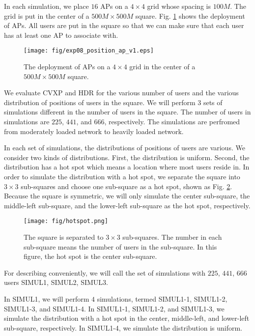 	In each simulation, we place $16$ APs on a $4 \times 4$ grid whose spacing is $100 M$. The grid is put in the center of a $500 M \times 500 M$ square. Fig. \ref{figure:exp08_p_a_v1} shows the deployment of APs. All users are put in the square so that we can make sure that each user has at least one AP to associate with.
	
	\begin{figure}
		\begin{center}
			\texttt{[image: fig/exp08\_position\_ap\_v1.eps]}
			\caption{The deployment of APs on a $4 \times 4$ grid in the center of a $500 M \times 500 M$ square.}
			\label{figure:exp08_p_a_v1}
		\end{center}
	\end{figure}
		
	We evaluate CVXP and HDR for the various number of users and the various distribution of positions of users in the square. We will perform $3$ sets of simulations different in the number of users in the square. The number of users in simulations are $225$, $441$, and $666$, respectively. The simulations are perfromed from moderately loaded network to heavily loaded network.

	In each set of simulations, the distributions of positions of users are various. We consider two kinds of distributions. First, the distribution is uniform. Second, the distribution has a hot spot which means a location where most users reside in. In order to simulate the distribution with a hot spot, we separate the square into $3 \times 3$ sub-squares and choose one sub-square as a hot spot, shown as Fig. \ref{figure:hotspot}. Because the square is symmetric, we will only simulate the center sub-square, the middle-left sub-square, and the lower-left sub-square as the hot spot, respectively.

	\begin{figure}
		\begin{center}
			\texttt{[image: fig/hotspot.png]}
			\caption{The square is separated to $3 \times 3$ sub-squares. The number in each sub-square means the number of users in the sub-square. In this figure, the hot spot is the center sub-square.}
			\label{figure:hotspot}
		\end{center}
	\end{figure}
	
	For describing conveniently, we will call the set of simulations with $225$, $441$, $666$ users SIMUL1, SIMUL2, SIMUL3.

	In SIMUL1, we will perform $4$ simulations, termed SIMUL1-1, SIMUL1-2, SIMUL1-3, and SIMUL1-4. In SIMUL1-1, SIMUL1-2, and SIMUL1-3, we simulate the distribution with a hot spot in the center, middle-left, and lower-left sub-square, respectively. In SIMUL1-4, we simulate the distribution is uniform.

